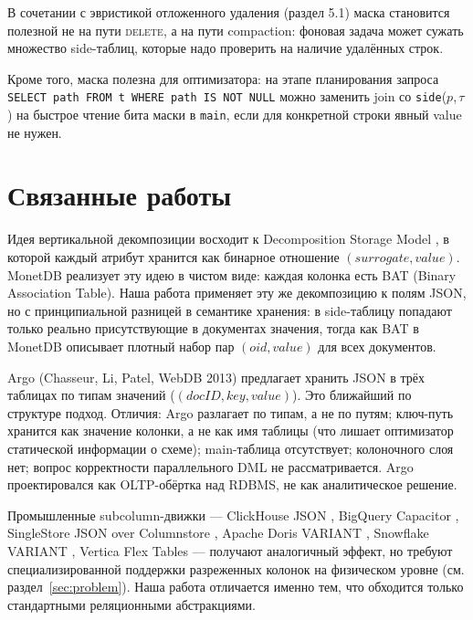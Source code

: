 \documentclass[conference,a4paper,10pt]{IEEEtran}
\begin{document}
В сочетании с эвристикой отложенного удаления (раздел 5.1) маска
становится полезной не на пути \textsc{delete}, а на пути
compaction: фоновая задача может сужать множество side-таблиц,
которые надо проверить на наличие удалённых строк.

Кроме того, маска полезна для оптимизатора: на этапе планирования
запроса \texttt{SELECT path FROM t WHERE path IS NOT NULL} можно
заменить join со \texttt{side}($p$,\,$\tau$) на быстрое чтение
бита маски в \texttt{main},
если для конкретной строки явный value не нужен.

\section{Связанные работы}
\label{sec:related}

Идея вертикальной декомпозиции восходит к Decomposition Storage
Model \cite{dsm1985}, в которой каждый атрибут хранится как
бинарное отношение $(\textit{surrogate}, \textit{value})$. MonetDB
\cite{monetdb} реализует эту идею в чистом виде: каждая колонка
есть BAT (Binary Association Table). Наша работа применяет эту же
декомпозицию к полям JSON, но с принципиальной разницей в семантике
хранения: в side-таблицу попадают только реально присутствующие в
документах значения, тогда как BAT в MonetDB описывает плотный
набор пар $(\textit{oid}, \textit{value})$ для всех документов.

Argo \cite{argo} (Chasseur, Li, Patel, WebDB 2013) предлагает
хранить JSON в трёх таблицах по типам значений
($(\textit{docID}, \textit{key}, \textit{value})$). Это
ближайший по структуре подход. Отличия: Argo разлагает по типам, а
не по путям; ключ-путь хранится как значение колонки, а не как имя
таблицы (что лишает оптимизатор статической информации о схеме);
main-таблица отсутствует; колоночного слоя нет; вопрос корректности
параллельного DML не рассматривается. Argo проектировался как
OLTP-обёртка над RDBMS, не как аналитическое решение.

Промышленные subcolumn-движки --- ClickHouse JSON
\cite{clickhouseJson,clickhouseShared}, BigQuery Capacitor
\cite{bigqueryCapacitor}, SingleStore JSON over Columnstore
\cite{singlestoreJson}, Apache Doris VARIANT \cite{dorisVariant},
Snowflake VARIANT \cite{snowflakeSigmod}, Vertica Flex Tables
\cite{verticaFlex} --- получают аналогичный эффект, но требуют
специализированной поддержки разреженных колонок на физическом
уровне (см. раздел~\ref{sec:problem}). Наша работа отличается
именно тем, что обходится только стандартными реляционными
абстракциями.
\end{document}
